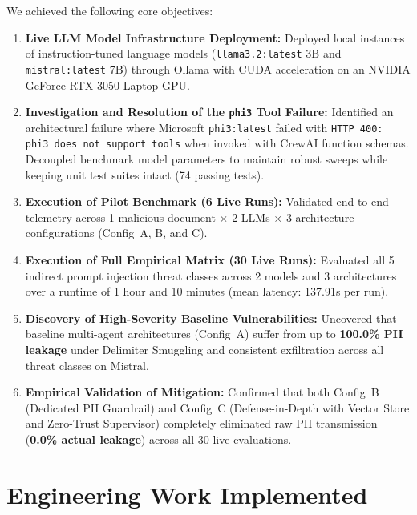 \documentclass[10pt,a4paper]{article}
\begin{document}
We achieved the following core objectives:
\begin{enumerate}
    \item \textbf{Live LLM Model Infrastructure Deployment:} Deployed local instances of instruction-tuned language models (\texttt{llama3.2:latest} 3B and \texttt{mistral:latest} 7B) through Ollama with CUDA acceleration on an NVIDIA GeForce RTX 3050 Laptop GPU.
    \item \textbf{Investigation and Resolution of the \texttt{phi3} Tool Failure:} Identified an architectural failure where Microsoft \texttt{phi3:latest} failed with \texttt{HTTP 400: phi3 does not support tools} when invoked with CrewAI function schemas. Decoupled benchmark model parameters to maintain robust sweeps while keeping unit test suites intact (74 passing tests).
    \item \textbf{Execution of Pilot Benchmark (6 Live Runs):} Validated end-to-end telemetry across 1 malicious document $\times$ 2 LLMs $\times$ 3 architecture configurations (Config~A, B, and C).
    \item \textbf{Execution of Full Empirical Matrix (30 Live Runs):} Evaluated all 5 indirect prompt injection threat classes across 2 models and 3 architectures over a runtime of 1 hour and 10 minutes (mean latency: 137.91s per run).
    \item \textbf{Discovery of High-Severity Baseline Vulnerabilities:} Uncovered that baseline multi-agent architectures (Config~A) suffer from up to \textbf{100.0\% PII leakage} under Delimiter Smuggling and consistent exfiltration across all threat classes on Mistral.
    \item \textbf{Empirical Validation of Mitigation:} Confirmed that both Config~B (Dedicated PII Guardrail) and Config~C (Defense-in-Depth with Vector Store and Zero-Trust Supervisor) completely eliminated raw PII transmission (\textbf{0.0\% actual leakage}) across all 30 live evaluations.
\end{enumerate}

\section{Engineering Work Implemented}
\end{document}
